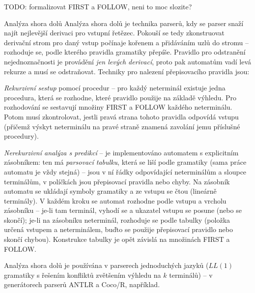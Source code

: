 TODO: formalizovat FIRST a FOLLOW, neni to moc slozite?

\begin{definiceN}{Analýza shora dolů}
Analýza shora dolů je technika parserů, kdy se parser snaží najít nejlevější derivaci pro vstupní řetězec. Pokouší se tedy zkonstruovat derivační strom pro daný vstup počínaje kořenem a přidáváním uzlů do stromu -- rozhoduje se, podle kterého pravidla gramatiky přepíše. Pravidlo pro odstranění nejednoznačnosti je provádění \emph{jen levých derivací}, proto pak automatům vadí levá rekurze a musí se odstraňovat. Techniky pro nalezení přepisovacího pravidla jsou:
\begin{pitemize}
    \item \emph{Rekurzivní sestup} pomocí procedur -- pro každý neterminál existuje jedna procedura, která se rozhodne, které pravidlo použije na základě výhledu. Pro rozhodování se sestavují množiny FIRST a FOLLOW každého neterminálu. Potom musí zkontrolovat, jestli pravá strana tohoto pravidla odpovídá vstupu (přičemž výskyt neterminálu na pravé straně znamená zavolání jemu příslušné procedury).     
    \item \emph{Nerekurzivní analýza s predikcí} -- je implementováno automatem s explicitním zásobníkem: ten má \emph{parsovací tabulku}, která se liší podle gramatiky (sama práce automatu je vždy stejná) -- jsou v ní řádky odpovídající neterminálům a sloupce terminálům, v políčkách jsou přepisovací pravidla  nebo chyby. Na zásobník automatu se ukládají symboly gramatiky a ze vstupu se čtou (lineárně terminály). V každém kroku se automat rozhodne podle vstupu a vrcholu zásobníku -- je-li tam terminál, vyhodí se a ukazatel vstupu se posune (nebo se skončí); je-li na zásobníku neterminál, rozhoduje se podle tabulky (položka určená vstupem a neterminálem, buďto se použije přepisovací pravidlo nebo skončí chybou). Konstrukce tabulky je opět závislá na množinách FIRST a FOLLOW.
\end{pitemize}
Analýza shora dolů je používána v parserech jednoduchých jazyků ($LL(1)$ gramatiky s řešením konfliktů zvětšením výhledu na $k$ terminálů) -- v generátorech parserů ANTLR a Coco/R, například.
\end{definiceN}

